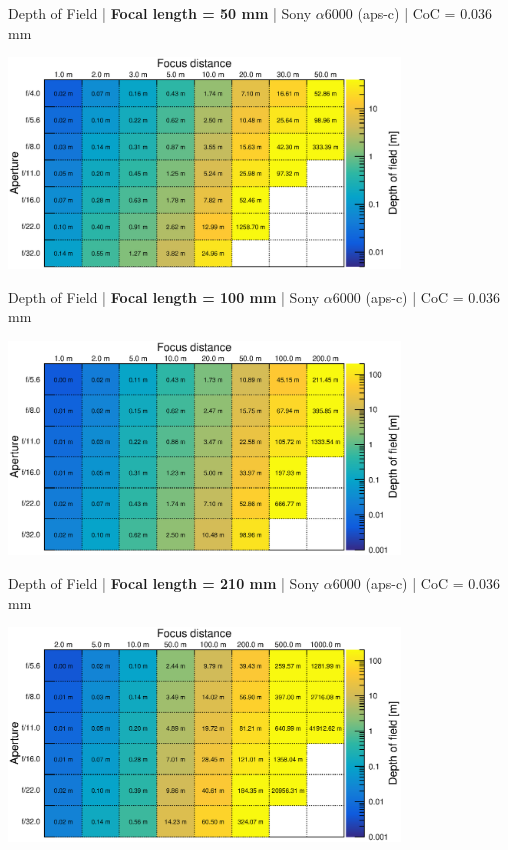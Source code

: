 \documentclass[aspectratio=169]{beamer}
\begin{document}
\begin{frame}[plain]{}
  \vspace{1ex}
  \centering
  Depth of Field | {\bf Focal length = 50 mm} |  Sony $\alpha$\hspace{0.1em}6000 (aps-c) | CoC = 0.036 mm
  
  \includegraphics[center,width=0.78\textwidth]{img/depth-of-field_focl50.eps}
\end{frame}

\begin{frame}[plain]{}
  \vspace{1ex}
  \centering
  Depth of Field | {\bf Focal length = 100 mm} |  Sony $\alpha$\hspace{0.1em}6000 (aps-c) | CoC = 0.036 mm
  
  \includegraphics[center,width=0.78\textwidth]{img/depth-of-field_focl100.eps}
\end{frame}

\begin{frame}[plain]{}
  \vspace{1ex}
  \centering
  Depth of Field | {\bf Focal length = 210 mm} |  Sony $\alpha$\hspace{0.1em}6000 (aps-c) | CoC = 0.036 mm
  
  \includegraphics[center,width=0.78\textwidth]{img/depth-of-field_focl210.eps}
\end{frame}
\end{document}
